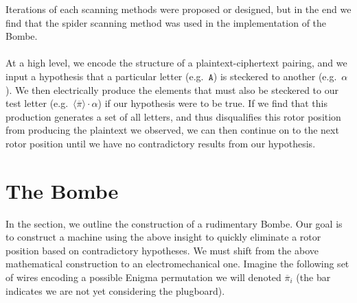 Iterations of each scanning methods were proposed or designed, but in
the end we find that the spider scanning method was used in the
implementation of the Bombe.
\\\\At a high level, we encode the structure
of a plaintext-ciphertext pairing, and we input a hypothesis that a particular
letter (e.g.\ $\texttt{A}$) is steckered to another (e.g.\ $\alpha$). We then
electrically produce the elements that must also be steckered to our test letter
(e.g.\ $\langle\overline{\pi}\rangle\cdot\alpha$) if our hypothesis
were to be true. If we find that this production generates a set of
all letters, and thus disqualifies this rotor position from producing
the plaintext we observed, we can then continue on to the next rotor
position until we have no contradictory results from our hypothesis.

\section{The Bombe}

In the section, we outline the construction of a rudimentary Bombe.
Our goal is to construct a machine using the above insight to quickly
eliminate a rotor position based on contradictory hypotheses. We must
shift from the above mathematical construction to an
electromechanical one. %
Imagine the following set of wires encoding a possible Enigma
permutation we will denoted $\overline\pi_i$ (the bar
indicates we are not yet considering the plugboard).


